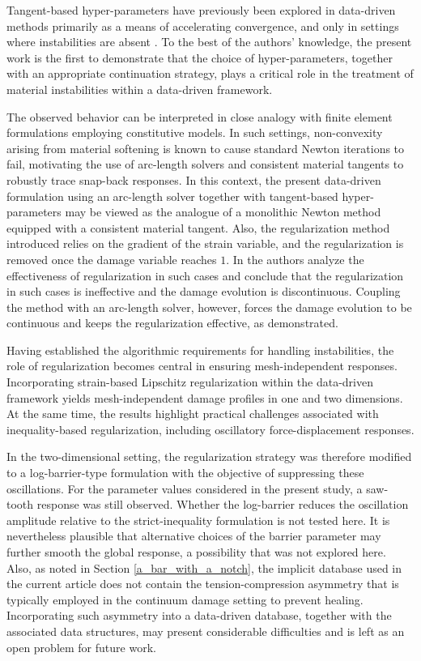\documentclass[10pt,review]{cas-sc}
\begin{document}
Tangent-based hyper-parameters have previously been explored in data-driven methods primarily as a means of accelerating convergence, and only in settings where instabilities are absent \cite{Pham2023,Nguyen2022,Kanno2019}. To the best of the authors’ knowledge, the present work is the first to demonstrate that the choice of hyper-parameters, together with an appropriate continuation strategy, plays a critical role in the treatment of material instabilities within a data-driven framework.

The observed behavior can be interpreted in close analogy with finite element formulations employing constitutive models. In such settings, non-convexity arising from material softening is known to cause standard Newton iterations to fail, motivating the use of arc-length solvers and consistent material tangents to robustly trace snap-back responses. In this context, the present data-driven formulation using an arc-length solver together with tangent-based hyper-parameters may be viewed as the analogue of a monolithic Newton method equipped with a consistent material tangent. Also, the regularization method introduced relies on the gradient of the strain variable, and the regularization is removed once the damage variable reaches $1$. In \cite{le2018strain} the authors analyze the effectiveness of regularization in such cases and conclude that the regularization in such cases is ineffective and the damage evolution is discontinuous. Coupling the method with an arc-length solver, however, forces the damage evolution to be continuous and keeps the regularization effective, as demonstrated.

Having established the algorithmic requirements for handling instabilities, the role of regularization becomes central in ensuring mesh-independent responses. Incorporating strain-based Lipschitz regularization within the data-driven framework yields mesh-independent damage profiles in one and two dimensions. At the same time, the results highlight practical challenges associated with inequality-based regularization, including oscillatory force-displacement responses.

In the two-dimensional setting, the regularization strategy was therefore modified to a log-barrier-type formulation with the objective of suppressing these oscillations. For the parameter values considered in the present study, a saw-tooth response was still observed. Whether the log-barrier reduces the oscillation amplitude relative to the strict-inequality formulation is not tested here. It is nevertheless plausible that alternative choices of the barrier parameter may further smooth the global response, a possibility that was not explored here. Also, as noted in Section \ref{a_bar_with_a_notch}, the implicit database used in the current article does not contain the tension-compression asymmetry that is typically employed in the continuum damage setting to prevent healing. Incorporating such asymmetry into a data-driven database, together with the associated data structures, may present considerable difficulties and is left as an open problem for future work.
\end{document}
